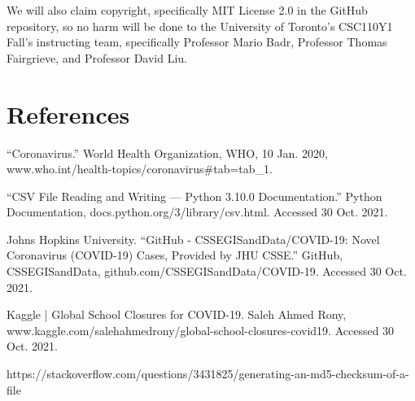 \documentclass[fontsize=11pt]{article}
\begin{document}
    We will also claim copyright, specifically MIT License 2.0 in the GitHub repository, so no harm will be done to the University of Toronto's CSC110Y1 Fall's instructing team, specifically Professor Mario Badr, Professor Thomas Fairgrieve, and Professor David Liu.

    \newpage

    \section{References}

    “Coronavirus.” World Health Organization, WHO, 10 Jan. 2020, www.who.int/health-topics/coronavirus\#tab=tab\_1.

    “CSV File Reading and Writing — Python 3.10.0 Documentation.” Python Documentation, docs.python.org/3/library/csv.html. Accessed 30 Oct. 2021.

    Johns Hopkins University. “GitHub - CSSEGISandData/COVID-19: Novel Coronavirus (COVID-19) Cases, Provided by JHU CSSE.” GitHub, CSSEGISandData, github.com/CSSEGISandData/COVID-19. Accessed 30 Oct. 2021.

    Kaggle | Global School Closures for COVID-19. Saleh Ahmed Rony, www.kaggle.com/salehahmedrony/global-school-closures-covid19. Accessed 30 Oct. 2021.

    https://stackoverflow.com/questions/3431825/generating-an-md5-checksum-of-a-file
\end{document}
